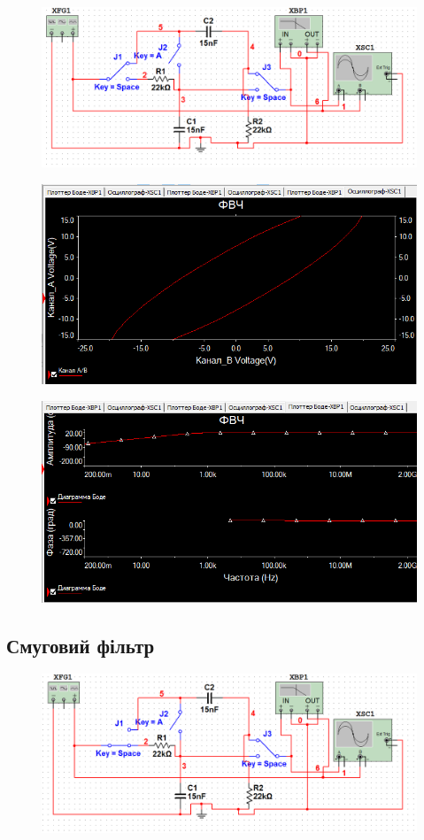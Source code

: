 \begin{figure}[ht]
\centering
\includegraphics[width=0.6\linewidth]{Pic/second_circuit.png}
\end{figure}


\begin{figure}[ht]
\centering
\includegraphics[width=0.65\linewidth]{Pic/second_1.png}
\end{figure}


\begin{figure}[ht]
\centering
\includegraphics[width=0.65\linewidth]{Pic/second_2.png}
\end{figure}
\newpage

\subsection{Смуговий фільтр}
\setlength{\parindent}{4em}


\begin{figure}[ht]
\centering
\includegraphics[width=0.6\linewidth]{Pic/third_circuit.png}
\end{figure}


